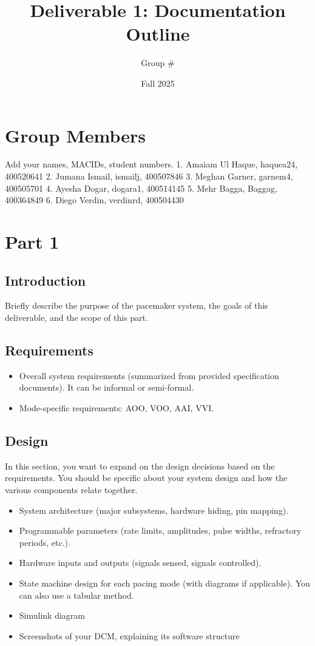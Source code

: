 \documentclass{article}
\title{Deliverable 1: Documentation Outline }
\author{Group \#}
\date{Fall 2025}
\begin{document}
\maketitle
\newpage

\tableofcontents
\newpage

\section{Group Members}

Add your names, MACIDs, student numbers.
1. Amaiam Ul Haque, haquea24, 400520641
2. Jumana Ismail, ismailj, 400507846
3. Meghan Garner, garnem4, 400505701
4. Ayesha Dogar, dogara1, 400514145
5. Mehr Bagga, Baggag, 400364849
6. Diego Verdin, verdinrd, 400504430

\section{Part 1}

\subsection{Introduction}
Briefly describe the purpose of the pacemaker system, the goals of this deliverable, and the scope of this part.

\subsection{Requirements}
\begin{itemize}
    \item Overall system requirements (summarized from provided specification documents). It can be informal or semi-formal.
    \item Mode-specific requirements: AOO, VOO, AAI, VVI.
\end{itemize}

\subsection{Design}

In this section, you want to expand on the design decisions based on the requirements. You should be specific about your system design and how the various components relate together.

\begin{itemize}
    \item System architecture (major subsystems, hardware hiding, pin mapping).
    \item Programmable parameters (rate limits, amplitudes, pulse widths, refractory periods, etc.).
    \item Hardware inputs and outputs (signals sensed, signals controlled).
    \item State machine design for each pacing mode (with diagrams if applicable). You can also use a tabular method.
    \item Simulink diagram
    \item Screenshots of your DCM, explaining its software structure
\end{itemize}
\end{document}
